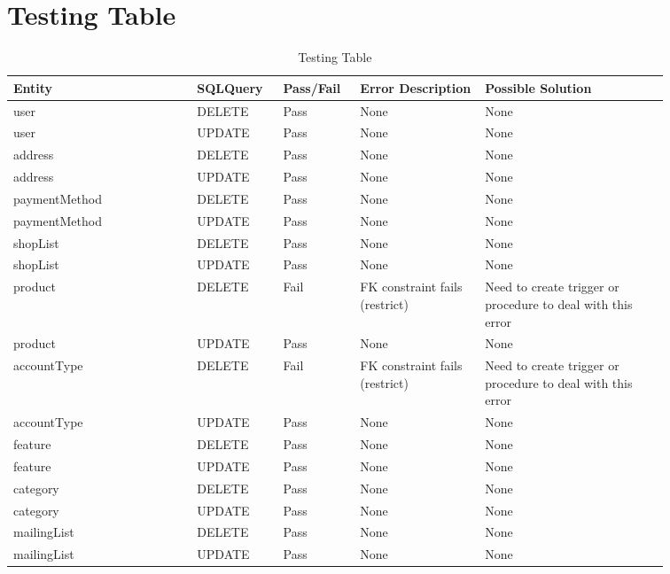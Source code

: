 \pagebreak
\section{Testing Table}

\begin{spacing}{1.25}
\begin{longtable}{ | p{0.25\linewidth} | p{0.1\linewidth} | p{0.09\linewidth} | p{0.17\linewidth} | p{0.25\linewidth} | }
\caption{Testing Table}\\
\hline
Entity						&	SQLQuery	&	Pass/Fail	&	Error Description				&	Possible Solution\\\hline\endhead
user						&	DELETE		&	Pass		&	None							&	None				\\\hline
user						&	UPDATE		&	Pass		&	None							&	None				\\\hline
address						&	DELETE		&	Pass		&	None							&	None				\\\hline
address						&	UPDATE		&	Pass		&	None							&	None				\\\hline
paymentMethod				&	DELETE		&	Pass		&	None							&	None				\\\hline
paymentMethod				&	UPDATE		&	Pass		&	None							&	None				\\\hline
shopList					&	DELETE		&	Pass		&	None							&	None				\\\hline
shopList					&	UPDATE		&	Pass		&	None							&	None				\\\hline
product						&	DELETE		&	Fail		&	FK constraint fails (restrict)	&	Need to create trigger or procedure to deal with this error\\\hline
product						&	UPDATE		&	Pass		&	None							&	None				\\\hline
accountType					&	DELETE		&	Fail		&	FK constraint fails (restrict)	&	Need to create trigger or procedure to deal with this error\\\hline
accountType					&	UPDATE		&	Pass		&	None							&	None				\\\hline
feature						&	DELETE		&	Pass		&	None							&	None				\\\hline
feature						&	UPDATE		&	Pass		&	None							&	None				\\\hline
category					&	DELETE		&	Pass		&	None							&	None				\\\hline
category					&	UPDATE		&	Pass		&	None							&	None				\\\hline
mailingList					&	DELETE		&	Pass		&	None							&	None				\\\hline
mailingList					&	UPDATE		&	Pass		&	None							&	None				\\\hline

\end{longtable}
\end{spacing}
